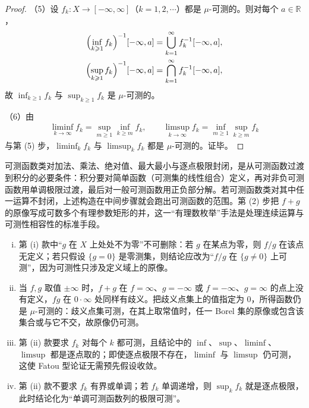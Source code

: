\documentclass[../../main.tex]{subfiles}
\begin{document}
\begin{proof}
（5）设 $f_{k}:X\to[-\infty,\infty]$（$k=1,2,\cdots$）都是 $\mu$-可测的。则对每个 $a\in\mathbb{R}$，
\begin{align*}
\Bigl(\inf_{k\geqslant1}f_{k}\Bigr)^{-1}[-\infty,a]&=\bigcup_{k=1}^{\infty}f_{k}^{-1}[-\infty,a],\\
\Bigl(\sup_{k\geqslant1}f_{k}\Bigr)^{-1}[-\infty,a]&=\bigcap_{k=1}^{\infty}f_{k}^{-1}[-\infty,a],
\end{align*}
故 $\inf_{k\geqslant1}f_{k}$ 与 $\sup_{k\geqslant1}f_{k}$ 是 $\mu$-可测的。

（6）由
\begin{align*}
\liminf_{k\to\infty}f_{k}=\sup_{m\geqslant1}\inf_{k\geqslant m}f_{k},\qquad
\limsup_{k\to\infty}f_{k}=\inf_{m\geqslant1}\sup_{k\geqslant m}f_{k}
\end{align*}
与第 (5) 步，$\liminf_{k}f_{k}$ 与 $\limsup_{k}f_{k}$ 都是 $\mu$-可测的。证毕。
\end{proof}

\begin{remark}\label{remark:ch01-thm-1-11-动机}
可测函数类对加法、乘法、绝对值、最大最小与逐点极限封闭，是从可测函数过渡到积分的必要条件：积分要对简单函数（可测集的线性组合）定义，再对非负可测函数用单调极限过渡，最后对一般可测函数用正负部分解。若可测函数类对其中任一运算不封闭，上述构造在中间步骤就会跑出可测函数的范围。第 (2) 步把 $f+g$ 的原像写成可数多个有理参数矩形的并，这一“有理数枚举”手法是处理连续运算与可测性相容性的标准手段。
\end{remark}

\begin{remark}\label{remark:ch01-thm-1-11-条件}
\begin{enumerate}[(i)]
\item 第 (i) 款中“$g$ 在 $X$ 上处处不为零”不可删除：若 $g$ 在某点为零，则 $f/g$ 在该点无定义；若只假设 $\{g=0\}$ 是零测集，则结论应改为“$f/g$ 在 $\{g\neq0\}$ 上可测”，因为可测性只涉及定义域上的原像。
\item 当 $f,g$ 取值 $\pm\infty$ 时，$f+g$ 在 $f=\infty$、$g=-\infty$ 或 $f=-\infty$、$g=\infty$ 的点上没有定义，$fg$ 在 $0\cdot\infty$ 处同样有歧义。把歧义点集上的值指定为 $0$，所得函数仍是 $\mu$-可测的：歧义点集可测，在其上取常值时，任一 Borel 集的原像或包含该集合或与它不交，故原像仍可测。
\item 第 (ii) 款要求 $f_{k}$ 对每个 $k$ 都可测，且结论中的 $\inf$、$\sup$、$\liminf$、$\limsup$ 都是逐点取的；即使逐点极限不存在，$\liminf$ 与 $\limsup$ 仍可测，这使 Fatou 型论证无需预先假设收敛。
\item 第 (ii) 款不要求 $f_{k}$ 有界或单调；若 $f_{k}$ 单调递增，则 $\sup_{k}f_{k}$ 就是逐点极限，此时结论化为“单调可测函数列的极限可测”。
\end{enumerate}
\end{remark}
\end{document}
